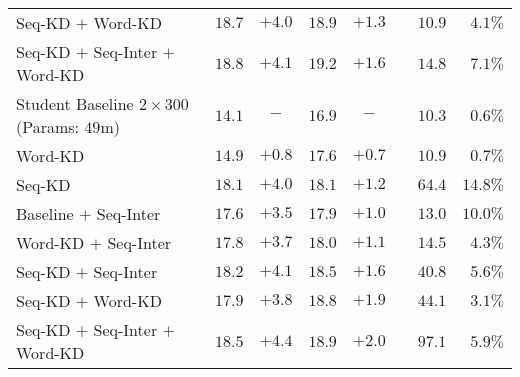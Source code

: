 \documentclass[11pt,letterpaper]{article}
\begin{document}
\begin{table*}[!ht]
\begin{tabular}{l c c  c c r r r }
\hspace{4mm} Seq-KD $+$ Word-KD  & $18.7$ & $+4.0$& $18.9$& $+1.3$& & $10.9$ & $4.1\%$  \\
\hspace{4mm} Seq-KD $+$ Seq-Inter $+$ Word-KD  & $18.8$ & $+4.1$& $19.2$& $+1.6$& & $14.8$ &$7.1\%$  \\
\midrule
Student Baseline $2 \times 300$ $\,$ (Params: $49$m) & $14.1$ & $-$ & $16.9$&  $-$ &  & $10.3$ & $0.6\%$ \\
\hspace{4mm}  Word-KD  & $14.9$ & $+0.8$& $17.6$& $+0.7$& & $10.9$ & $0.7\%$  \\
\hspace{4mm}  Seq-KD  & $18.1$ & $+4.0$& $18.1$& $+1.2$&  & $64.4$ & $14.8\%$  \\
 \hspace{4mm} Baseline $+$ Seq-Inter  & $17.6$ & $+3.5$& $17.9$& $+1.0$&  & $13.0$ & $10.0\%$ \\
\hspace{4mm} Word-KD $+$ Seq-Inter   & $17.8$ & $+3.7$& $18.0$& $+1.1$& & $14.5$ & $4.3\%$ \\
\hspace{4mm}  Seq-KD $+$ Seq-Inter  & $18.2$ & $+4.1$& $18.5$& $+1.6$&  & $40.8$ & $5.6\%$ \\
\hspace{4mm} Seq-KD $+$ Word-KD & $17.9$ & $+3.8$& $18.8$& $+1.9$& & $44.1$ & $3.1\%$  \\
\hspace{4mm} Seq-KD $+$ Seq-Inter $+$ Word-KD  & $18.5$ & $+\mathbf{4.4}$& $18.9$& $+\mathbf{2.0}$& & $97.1$& $5.9\%$  \\


\end{tabular}
\end{table*}
\end{document}
